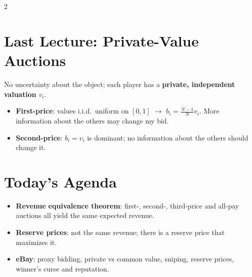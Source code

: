 \documentclass[a4paper,9pt]{extarticle}
\begin{document}

\thispagestyle{fancy}



\begin{multicols}{2}



\section{Last Lecture: Private-Value Auctions}


No uncertainty about the object; each player has a \textbf{private, independent valuation
$v_i$}.


\begin{itemize}

\item \textbf{First-price}: values i.i.d.\ uniform on $[0,1]$ $\rightarrow$
$b_i = \frac{N-1}{N} v_i$. More information about the others may change my bid.

\item \textbf{Second-price}: $b_i = v_i$ is dominant; no information about the others should
change it.

\end{itemize}



\section{Today's Agenda}


\begin{itemize}

\item \textbf{Revenue equivalence theorem}: first-, second-, third-price and all-pay auctions
all yield the same expected revenue.

\item \textbf{Reserve prices}: not the same revenue; there is a reserve price that maximizes
it.

\item \textbf{eBay}: proxy bidding, private vs common value, sniping, reserve prices, winner's
curse and reputation.

\end{itemize}




\end{multicols}
\end{document}
